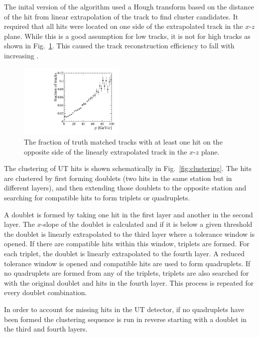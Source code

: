 The inital version of the \velout algorithm used a Hough transform based on the distance of the hit from linear extrapolation of the \velo track to find cluster candidates. It required that all hits were located on one side of the extrapolated \velo track in the $x$-$z$ plane. While this is a good assumption for low \ptot tracks, it is not for high \ptot tracks as shown in Fig.~\ref{fig:wrong_side_hits}. This caused the track reconstruction efficiency to fall with increasing \ptot.

\begin{figure}[!htb]
\centering
\includegraphics[width=0.45\textwidth]{figs/upstream-tracking-upgrade/wrong_side_hits.pdf}
\caption{The fraction of truth matched tracks with at least one hit on the opposite side of the linearly extrapolated \velo track in the $x$-$z$ plane.}%
\label{fig:wrong_side_hits}
\end{figure}

The clustering of UT hits is shown schematically in Fig.~\ref{fig:clustering}. The hits are clustered by first forming doublets (two hits in the same station but in different layers), and then extending those doublets to the opposite station and searching for compatible hits to form triplets or quadruplets. 
 
A doublet is formed by taking one hit in the first layer and another in the second layer. The $x$-slope of the doublet is calculated and if it is below a given threshold the doublet is linearly extrapolated to the third layer where a tolerance window is opened. If there are compatible hits within this window, triplets are formed. For each triplet, the doublet is linearly extrapolated to the fourth layer. A reduced tolerance window is opened and compatible hits are used to form quadruplets. If no quadruplets are formed from any of the triplets, triplets are also searched for with the original doublet and hits in the fourth layer. This process is repeated for every doublet combination.
 
In order to account for missing hits in the UT detector, if no quadruplets have been formed the clustering sequence is run in reverse starting with a doublet in the third and fourth layers.
 

